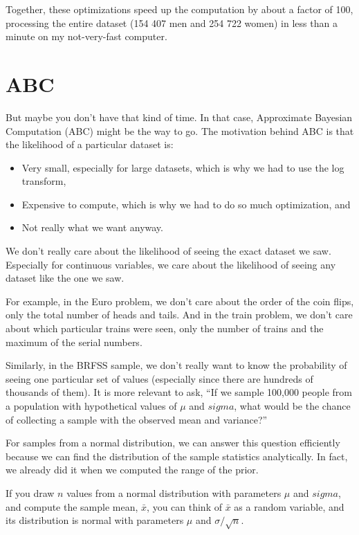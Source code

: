\documentclass[12pt]{book}
\begin{document}
Together, these optimizations speed up the computation by about a
factor of 100, processing the entire dataset (154
407 men and 254 722 women) in less than a minute on my not-very-fast
computer.


\section{ABC}

But maybe you don't have that kind of time.  In that case, Approximate
Bayesian Computation (ABC) might be the way to go.  The motivation behind
ABC is that the likelihood of a particular dataset is:

\begin{itemize}

\item Very small, especially for large datasets, which is why we had
to use the log transform,

\item Expensive to compute, which is why we had to do so much
optimization, and

\item Not really what we want anyway.

\end{itemize}

We don't really care about the likelihood of seeing the exact dataset
we saw.  Especially for continuous variables, we care about the
likelihood of seeing any dataset like the one we saw.

For example, in the Euro problem, we don't care about the order of
the coin flips, only the total number of heads and tails.  And in
the train problem, we don't care about which particular trains were
seen, only the number of trains and the maximum of the serial numbers.

Similarly, in the BRFSS sample, we don't really want to know the
probability of seeing one particular set of values (especially since
there are hundreds of thousands of them).  It is more
relevant to ask, ``If we sample 100,000 people from a population
with hypothetical values of $\mu$ and $sigma$, what would be
the chance of collecting a sample with the observed mean and
variance?''

For samples from a normal distribution, we can answer this question
efficiently because we can find the distribution of the sample
statistics analytically.  In fact, we already did it when we computed
the range of the prior.

If you draw $n$ values from a normal distribution with parameters
$\mu$ and $sigma$, and compute the sample mean, $\bar{x}$, you can
think of $\bar{x}$ as a random variable, and its distribution is
normal with parameters $\mu$ and $\sigma / \sqrt{n}$.
\end{document}
